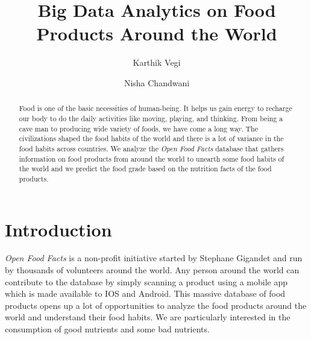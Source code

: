\documentclass[sigconf]{acmart}
\begin{document}
\title{Big Data Analytics on Food Products Around the World}

\author{Karthik Vegi}

\author{Nisha Chandwani}

\renewcommand{\shortauthors}{kvegi,nchandwa}

\begin{abstract}
Food is one of the basic necessities of human-being. It helps us gain energy to recharge our body to do the daily activities like moving, playing, and thinking. From being a cave man to producing wide variety of foods, we have come a long way. The civilizations shaped the food habits of the world and there is a lot of variance in the food habits across countries. We analyze the {\em Open Food Facts} database that gathers information on food products from around the world to unearth some food habits of the world and we predict the food grade based on the nutrition facts of the food products.
\end{abstract}


\maketitle

\section{Introduction}
{\em Open Food Facts} is a non-profit initiative started by Stephane Gigandet and run by thousands of volunteers around the world. Any person around the world can contribute to the database by simply scanning a product using a mobile app which is made available to IOS and Android. This massive database of food products opens up a lot of opportunities to analyze the food products around the world and understand their food habits. We are particularly interested in the consumption of good nutrients and some bad nutrients.
\end{document}
